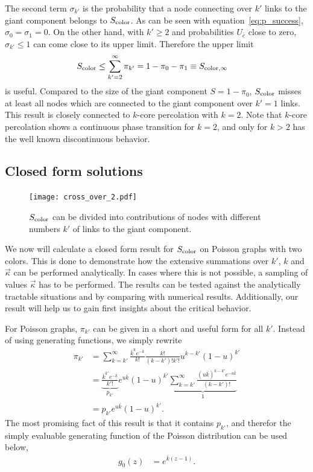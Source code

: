 \documentclass[aps, pre, onecolumn, a4paper, floatfix]{revtex4}
\begin{document}
The second term $\sigma_{k'}$ is the probability that a node 
connecting over $k'$ links to the giant component belongs to $S_{\rm color}$. 
As can be seen with equation~\ref{eq:p_success}, $\sigma_0=\sigma_1=0$. 
On the other hand, with $k'\geq 2$ and probabilities $U_{\bar c}$ close to zero, 
$\sigma_{k'}\leq 1$ can come close to its upper limit. 
Therefore the upper limit 
\begin{align}
S_{\rm color}\leq \sum_{k'=2}^{\infty} \pi_{k'} = 1-\pi_0-\pi_1 &\equiv S_{\rm color,\infty} 
\end{align}
is useful. Compared to the size of the giant component $S=1-\pi_0$, 
$S_{\rm color}$ misses at least all nodes 
which are connected to the giant component over $k'=1$ links. 
This result is closely connected to $k$-core percolation with $k=2$. 
Note that $k$-core percolation shows a continuous phase transition for $k=2$, 
and only for $k>2$ has the well known discontinuous behavior. 


\subsection{Closed form solutions}

\begin{figure}[htb]
    \texttt{[image: cross\_over\_2.pdf]}\\
    \caption{$S_{\rm color}$ can be divided into contributions of nodes with different numbers 
    $k'$ of links to the giant component.}
    \label{fig:2_colors}
\end{figure}
%
We now will calculate a closed form result for $S_{\rm color}$ 
on Poisson graphs with two colors. 
This is done to demonstrate how the extensive summations 
over $k'$, $k$ and $\vec \kappa$ can be performed analytically. 
In cases where this is not possible, 
a sampling of values $\vec \kappa$ has to be performed. 
The results can be tested against the analytically tractable situations 
and by comparing with numerical results. 
Additionally, our result will help us to gain first insights about the critical behavior. 

For Poisson graphs, $\pi_{k'}$ can be given in a short and useful form for all $k'$. 
Instead of using generating functions, we simply rewrite 
\begin{align}
\pi_{k'} &= \sum_{k=k'}^{\infty} \frac{{\bar k}^k e^{-{\bar k}}}{k!} \frac{k!}{(k-k')!k'!}u^{k-k'}(1-u)^{k'}\\
 &= \underbrace{ \frac{{\bar k}^{k'} e^{-{\bar k}}}{k'!}}_{p_{k'}} e^{u \bar k} (1-u)^{k'}
 \underbrace{ \sum_{k=k'}^{\infty} \frac{({u\bar k})^{k-k'} e^{-{u\bar k}}}{(k-k')!}}_{1}\\
 &= p_{k'} e^{u \bar k} (1-u)^{k'}.
\end{align}
The most promising fact of this result is that it contains $p_{k'}$, 
and therefor the simply evaluable generating function of the Poisson distribution can be used below, 
\begin{align}
g_0(z) &= e^{\bar{k}(z-1)}.\label{eq:g0}
\end{align}
\end{document}

